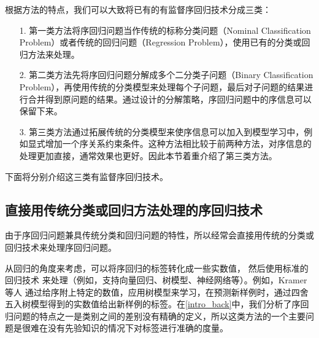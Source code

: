 根据方法的特点，我们可以大致将已有的有监督序回归技术分成三类：
\begin{enumerate}
\item[1.]第一类方法将序回归问题当作传统的标称分类问题（Nominal Classification Problem）或者传统的回归问题（Regression Problem），使用已有的分类或回归方法来处理。
\item[2.]第二类方法先将序回归问题分解成多个二分类子问题（Binary Classification Problem），再使用传统的分类模型来处理每个子问题，最后对子问题的结果进行合并得到原问题的结果。通过设计的分解策略，序回归问题中的序信息可以保留下来。
\item[3.]第三类方法通过拓展传统的分类模型来使序信息可以加入到模型学习中，例如显式增加一个序关系约束条件。这种方法相比较于前两种方法，对序信息的处理更加直接，通常效果也更好。因此本节着重介绍了第三类方法。
\end{enumerate}

下面将分别介绍这三类有监督序回归技术。



\subsection{直接用传统分类或回归方法处理的序回归技术}
由于序回归问题兼具传统分类和回归问题的特性，所以经常会直接用传统的分类或回归技术来处理序回归问题。

从回归的角度来考虑，可以将序回归的标签转化成一些实数值\citep{torra2006regression}，
然后使用标准的回归技术\citep{bishop2006pattern}\citep{murphy2012machine}
来处理（例如，支持向量回归、树模型、神经网络等）。例如，Kramer等人\citep{kramer2001prediction}
通过给序附上特定的数值，应用树模型来学习，在预测新样例时，通过四舍五入树模型得到的实数值给出新样例的标签。在\autoref{intro_back}中，我们分析了序回归问题的特点之一是类别之间的差别没有精确的定义，所以这类方法的一个主要问题是很难在没有先验知识的情况下对标签进行准确的度量。


